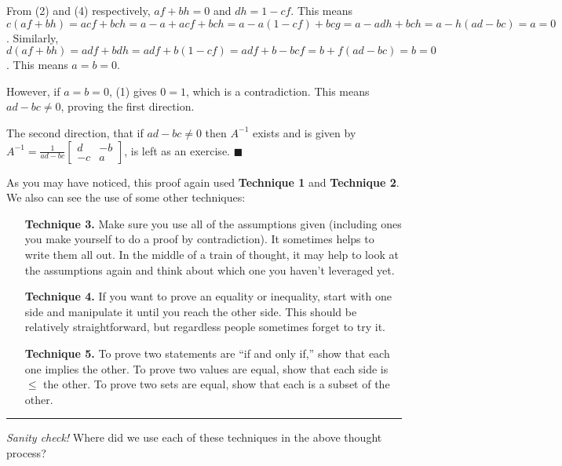 \documentclass[11pt]{article}
\begin{document}
    From (2) and (4) respectively, $af+bh=0$ and $dh=1-cf$. This means 
    $c(af+bh)=acf+bch=a-a+acf+bch=a-a(1-cf)+bcg=a-adh+bch=a-h(ad-bc)=a=0$.
    Similarly,
    $d(af+bh)=adf+bdh=adf+b(1-cf)=adf+b-bcf=b+f(ad-bc)=b=0$. This means $a=b=0$.
    
    However, if $a=b=0$, (1) gives $0=1$, which is a contradiction. This means
    $ad-bc\neq0$, proving the first direction.
    
    The second direction, that if $ad-bc\neq0$ then $A^{-1}$ exists and is given by
    $A^{-1}=\frac1{ad-bc}\begin{bmatrix}d & -b \\ -c & a\end{bmatrix}$, is left as
    an exercise. $\blacksquare$
    
    As you may have noticed, this proof again used \textbf{Technique 1} and
    \textbf{Technique 2}. We also can see the use of some other techniques:
    
    \begin{enumerate}
        \item[\textbf{Technique 3.}]
        Make sure you use all of the assumptions given (including ones you make yourself
        to do a proof by contradiction). It sometimes helps to write them
        all out. In the middle of a train of thought, it may help to look at the
        assumptions again and think about which one you haven't leveraged yet.
        
        \item[\textbf{Technique 4.}]
        If you want to prove an equality or inequality, start with one side and manipulate
        it until you reach the other side. This should be relatively straightforward, but
        regardless people sometimes forget to try it.
        
        \item[\textbf{Technique 5.}]
        To prove two statements are ``if and only if,'' show that each one implies 
        the other. To prove two values are equal, show that each side is $\leq$ the
        other. To prove two sets are equal, show that each is a subset of the other.
        
    \end{enumerate}

    \rule{\textwidth}{0.4pt}
    
    \vspace{-5pt}
    \textit{Sanity check!} Where did we use each of these techniques in the above thought
    process?
    
\end{document}
